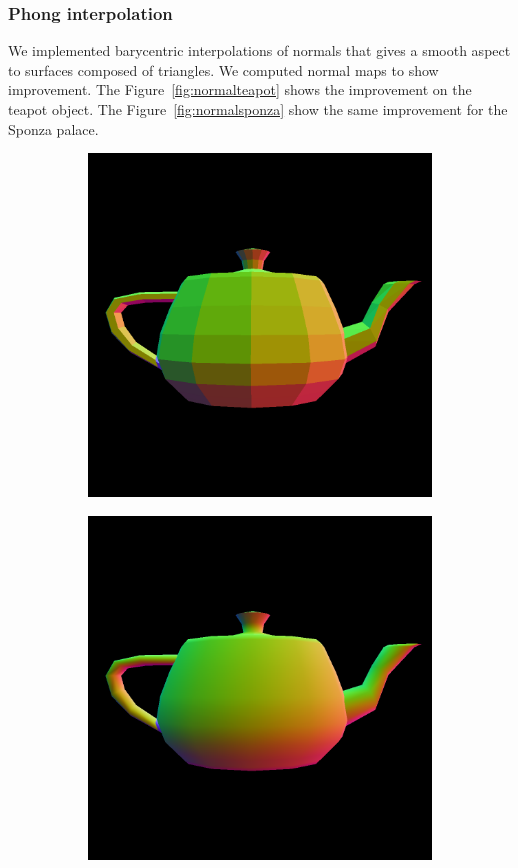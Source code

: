 \documentclass[a4paper,11pt]{article}%
\begin{document}
\subsubsection*{Phong interpolation}
We implemented barycentric interpolations of normals that gives a smooth aspect to surfaces composed of triangles. We computed normal maps to show improvement.
The Figure~\ref{fig:normalteapot} shows the improvement on the teapot object. The Figure~\ref{fig:normalsponza} show the same improvement for the Sponza palace.
\begin{figure}[h]
    \centering
    
\begin{subfigure}{.5\textwidth}
  \centering
  \includegraphics[width=.9\linewidth]{img/nnteapot.png}
\end{subfigure}%
\begin{subfigure}{.5\textwidth}
  \centering
  \includegraphics[width=.9\linewidth]{img/nteapot.png}
\end{subfigure}    
    

\end{figure}
\end{document}
